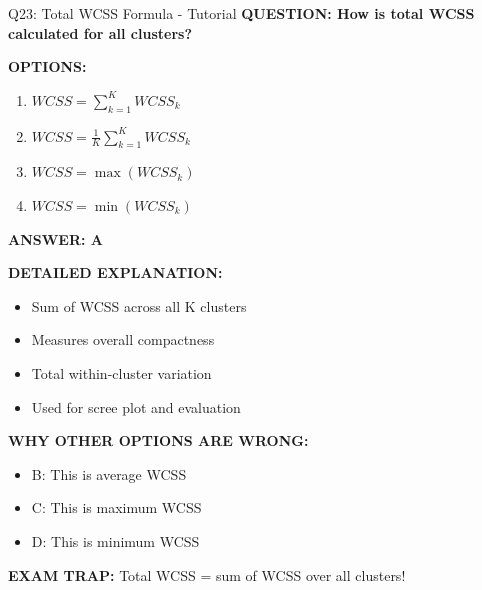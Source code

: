 \documentclass[8pt]{beamer}
\begin{document}
	\begin{frame}{Q23: Total WCSS Formula - Tutorial}
		\fontsize{6.5}{7.5}\selectfont
		\textbf{QUESTION: How is total WCSS calculated for all clusters?}
		
		\vspace{0.1cm}
		\textbf{OPTIONS:}
		\begin{enumerate}
			\item $WCSS = \sum_{k=1}^K WCSS_k$
			\item $WCSS = \frac{1}{K} \sum_{k=1}^K WCSS_k$
			\item $WCSS = \max(WCSS_k)$
			\item $WCSS = \min(WCSS_k)$
		\end{enumerate}
		
		\vspace{0.1cm}
		\textcolor{myblue}{\textbf{ANSWER: A}}
		
		\vspace{0.1cm}
		\textbf{DETAILED EXPLANATION:}
		\begin{itemize}
			\item Sum of WCSS across all K clusters
			\item Measures overall compactness
			\item Total within-cluster variation
			\item Used for scree plot and evaluation
		\end{itemize}
		
		\vspace{0.1cm}
		\textcolor{myred}{\textbf{WHY OTHER OPTIONS ARE WRONG:}}
		\begin{itemize}
			\item \textcolor{myred}{B:} This is average WCSS
			\item \textcolor{myred}{C:} This is maximum WCSS
			\item \textcolor{myred}{D:} This is minimum WCSS
		\end{itemize}
		
		\textcolor{myred}{\textbf{EXAM TRAP:}} Total WCSS = \textcolor{myblue}{sum of WCSS over all clusters}!
	\end{frame}
	
\end{document}
